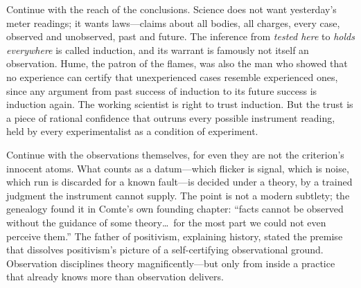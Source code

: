 Continue with the reach of the conclusions. Science does not want yesterday's meter readings; it wants laws---claims about all bodies, all charges, every case, observed and unobserved, past and future. The inference from \emph{tested here} to \emph{holds everywhere} is called induction, and its warrant is famously not itself an observation. Hume, the patron of the flames, was also the man who showed that no experience can certify that unexperienced cases resemble experienced ones, since any argument from past success of induction to its future success is induction again. The working scientist is right to trust induction. But the trust is a piece of rational confidence that outruns every possible instrument reading, held by every experimentalist as a condition of experiment.

Continue with the observations themselves, for even they are not the criterion's innocent atoms. What counts as a datum---which flicker is signal, which is noise, which run is discarded for a known fault---is decided under a theory, by a trained judgment the instrument cannot supply. The point is not a modern subtlety; the genealogy found it in Comte's own founding chapter: ``facts cannot be observed without the guidance of some theory\ldots\ for the most part we could not even perceive them.'' The father of positivism, explaining history, stated the premise that dissolves positivism's picture of a self-certifying observational ground. Observation disciplines theory magnificently---but only from inside a practice that already knows more than observation delivers.

